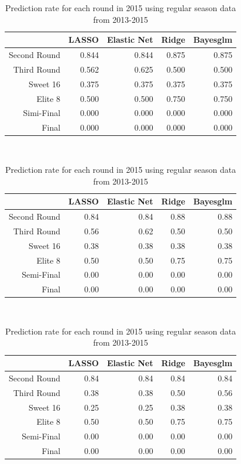 \documentclass{article} %
\begin{document}
\begin{table}[H]
\centering
{\small
\begin{tabular}{rrrrr}
  \hline
 & LASSO & Elastic Net & Ridge & Bayesglm \\ 
  \hline
Second Round & 0.844 & 0.844 & 0.875 & 0.875 \\ 
  Third Round & 0.562 & 0.625 & 0.500 & 0.500 \\ 
  Sweet 16 & 0.375 & 0.375 & 0.375 & 0.375 \\ 
  Elite 8 & 0.500 & 0.500 & 0.750 & 0.750 \\ 
  Simi-Final & 0.000 & 0.000 & 0.000 & 0.000 \\ 
  Final & 0.000 & 0.000 & 0.000 & 0.000 \\ 
   \hline
\end{tabular}
}
\caption{Prediction rate for each round in 2015}\

\centering
{\small
\begin{tabular}{rrrrr}
  \hline
 & LASSO & Elastic Net & Ridge & Bayesglm \\ 
  \hline
Second Round & 0.84 & 0.84 & 0.88 & 0.88 \\ 
  Third Round & 0.56 & 0.62 & 0.50 & 0.50 \\ 
  Sweet 16 & 0.38 & 0.38 & 0.38 & 0.38 \\ 
  Elite 8 & 0.50 & 0.50 & 0.75 & 0.75 \\ 
  Semi-Final & 0.00 & 0.00 & 0.00 & 0.00 \\ 
  Final & 0.00 & 0.00 & 0.00 & 0.00 \\ 
   \hline
\end{tabular}
}
\caption{Prediction rate for each round in 2015 using regular season data from 2014-2015}\ 

\centering
{\small
\begin{tabular}{rrrrr}
  \hline
 & LASSO & Elastic Net & Ridge & Bayesglm \\ 
  \hline
Second Round & 0.84 & 0.84 & 0.84 & 0.84 \\ 
  Third Round & 0.38 & 0.38 & 0.50 & 0.56 \\ 
  Sweet 16 & 0.25 & 0.25 & 0.38 & 0.38 \\ 
  Elite 8 & 0.50 & 0.50 & 0.75 & 0.75 \\ 
  Semi-Final & 0.00 & 0.00 & 0.00 & 0.00 \\ 
  Final & 0.00 & 0.00 & 0.00 & 0.00 \\ 
   \hline
\end{tabular}
}
\caption{Prediction rate for each round in 2015 using regular season data from 2013-2015} 
\end{table}
\end{document}
